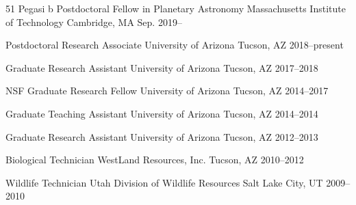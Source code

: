 

\begin{jobs}

  \job
    {51 Pegasi b Postdoctoral Fellow in Planetary Astronomy} %
    {Massachusetts Institute of Technology} %
    {Cambridge, MA} %
    {Sep. 2019--} %
    {}
    
  \job
    {Postdoctoral Research Associate} %
    {University of Arizona} %
    {Tucson, AZ} %
    {2018--present} %
    {}

  \job
    {Graduate Research Assistant} %
    {University of Arizona} %
    {Tucson, AZ} %
    {2017--2018} %
    {}

  \job
    {NSF Graduate Research Fellow} %
    {University of Arizona} %
    {Tucson, AZ} %
    {2014--2017} %
    {}

  \job
    {Graduate Teaching Assistant} %
    {University of Arizona} %
    {Tucson, AZ} %
    {2014--2014} %
    {}

  \job
    {Graduate Research Assistant} %
    {University of Arizona} %
    {Tucson, AZ} %
    {2012--2013} %
    {}

  \job
    {Biological Technician} %
    {WestLand Resources, Inc.} %
    {Tucson, AZ} %
    {2010--2012} %
    {}

  \job
    {Wildlife Technician} %
    {Utah Division of Wildlife Resources} %
    {Salt Lake City, UT} %
    {2009--2010} %
    {}



\end{jobs}
